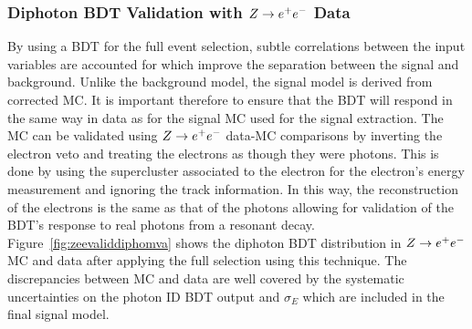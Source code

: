 \subsubsection{Diphoton BDT Validation with $Z\rightarrow e^{+}e^{-}$ Data}
By using a BDT for the full event selection, subtle correlations between the input variables are accounted for
which improve the separation between the signal and background. 
Unlike the background model, the signal model is derived from corrected MC. 
It is important therefore to ensure that the BDT will respond in the same way in data as for the signal MC
used for the signal extraction. The MC can be validated using $Z\rightarrow e^{+}e^{-}$ data-MC
comparisons by inverting the electron veto and treating the electrons as though they were photons.
This is done by using the supercluster associated to the electron for the electron's energy measurement 
and ignoring the track information. In this way, the reconstruction of the electrons is the same as that
of the photons allowing for validation of the BDT's response to real photons from a resonant decay. 
Figure~\ref{fig:zeevaliddiphomva} shows the diphoton BDT distribution in $Z\rightarrow e^{+}e^{-}$ MC and data after applying
the full selection using this technique. The discrepancies between MC and data are well covered by the 
systematic uncertainties on the photon ID BDT output and $\sigma_{E}$ which are included in the final signal model. 

